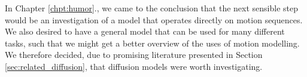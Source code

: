 
In Chapter \ref{chpt:humor}., we came to the conclusion that the next sensible step would be an investigation of a model that operates directly on motion sequences. We also desired to have a general model that can be used for many different tasks, such that we might get a better overview of the uses of motion modelling. We therefore decided, due to promising literature presented in Section \ref{sec:related_diffusion}, that diffusion models were worth investigating. 
